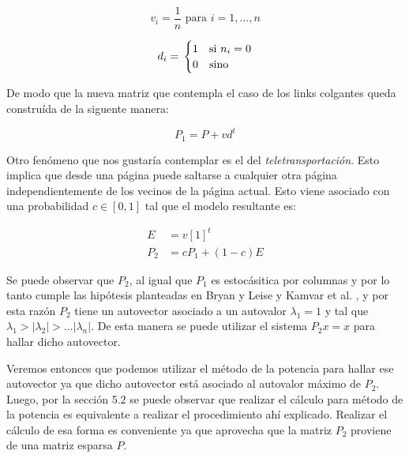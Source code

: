 \[ v_{i} = \frac{1}{n} \text{ para } i = 1, \dots, n\]

\[ d_{i} = \\
	\begin{cases}
		1 & \text{si } n_{i} = 0\\
		0 & \text{sino}
	\end{cases}
\]
 
De modo que la nueva matriz que contempla el caso de los links colgantes queda constru\'ida de la siguente manera:

\[ P_{1} = P + vd^{t}\]

Otro fen\'omeno que nos gustar\'ia contemplar es el del \emph{teletransportaci\'on}. Esto implica que desde una p\'agina puede saltarse a cualquier otra p\'agina independientemente de los vecinos de la p\'agina actual. Esto viene asociado con una probabilidad $c \in [0,1]$ tal que el modelo resultante es:

\begin{align*}
	E &= v[1]^{t}\\
	P_{2} &= cP_{1} + (1-c)E
\end{align*}

Se puede observar que $P_{2}$, al igual que $P_{1}$ es estoc\'asitica por columnas y por lo tanto cumple las hip\'otesis planteadas en Bryan y Leise\cite{Bryan2006} y Kamvar et al.\cite{Kamvar2003} , y por esta raz\'on $P_{2}$ tiene un autovector asociado a un autovalor $\lambda_{1} = 1$ y tal que $\lambda_{1} > |\lambda_{2}| > \dots |\lambda_{n}|$. De esta manera se puede utilizar el sistema $P_{2}x = x$ para hallar dicho autovector.


Veremos entonces que podemos utilizar el m\'etodo de la potencia para hallar ese autovector ya que dicho autovector est\'a asociado al autovalor m\'aximo de $P_{2}$. Luego, por la secci\'on 5.2 se puede observar que realizar el c\'alculo para m\'etodo de la potencia es equivalente a realizar el procedimiento ah\'i explicado. Realizar el c\'alculo de esa forma es conveniente ya que aprovecha que la matriz $P_{2}$ proviene de una matriz esparsa $P$.